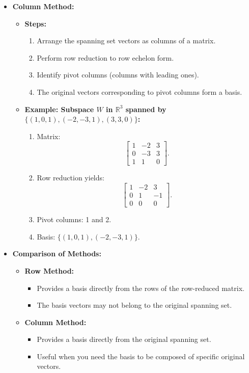 \documentclass{article}
\begin{document}
\begin{itemize}
  \item \textbf{Column Method:}
    \begin{itemize}
      \item \textbf{Steps:}
        \begin{enumerate}
          \item Arrange the spanning set vectors as columns of a matrix.
          \item Perform row reduction to row echelon form.
          \item Identify pivot columns (columns with leading ones).
          \item The original vectors corresponding to pivot columns form a basis.
        \end{enumerate}
      \item \textbf{Example: Subspace $W$ in $\mathbb{R}^3$ spanned by $\{(1, 0, 1), (-2, -3, 1), (3, 3, 0)\}$:}
        \begin{enumerate}
          \item Matrix:
            \[
              \begin{bmatrix}
                1 & -2 & 3 \\
                0 & -3 & 3 \\
                1 & 1 & 0
              \end{bmatrix}.
            \]
          \item Row reduction yields:
            \[
              \begin{bmatrix}
                1 & -2 & 3 \\
                0 & 1 & -1 \\
                0 & 0 & 0
              \end{bmatrix}.
            \]
          \item Pivot columns: 1 and 2.
          \item Basis: $\{(1, 0, 1), (-2, -3, 1)\}$.
        \end{enumerate}
    \end{itemize}

  \item \textbf{Comparison of Methods:}
    \begin{itemize}
      \item \textbf{Row Method:}
        \begin{itemize}
          \item Provides a basis directly from the rows of the row-reduced matrix.
          \item The basis vectors may not belong to the original spanning set.
        \end{itemize}
      \item \textbf{Column Method:}
        \begin{itemize}
          \item Provides a basis directly from the original spanning set.
          \item Useful when you need the basis to be composed of specific original vectors.
        \end{itemize}
    \end{itemize}
\end{itemize}
\end{document}
